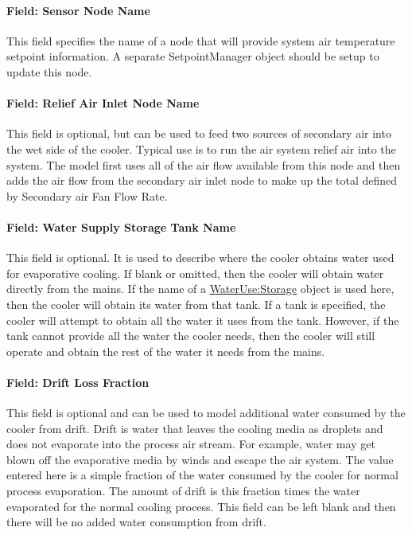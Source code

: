 \paragraph{Field: Sensor Node Name}\label{field-sensor-node-name-1}

This field specifies the name of a node that will provide system air temperature setpoint information. A separate SetpointManager object should be setup to update this node.

\paragraph{Field: Relief Air Inlet Node Name}\label{field-relief-air-inlet-node-name}

This field is optional, but can be used to feed two sources of secondary air into the wet side of the cooler. Typical use is to run the air system relief air into the system. The model first uses all of the air flow available from this node and then adds the air flow from the secondary air inlet node to make up the total defined by Secondary air Fan Flow Rate.

\paragraph{Field: Water Supply Storage Tank Name}\label{field-water-supply-storage-tank-name-4}

This field is optional. It is used to describe where the cooler obtains water used for evaporative cooling. If blank or omitted, then the cooler will obtain water directly from the mains. If the name of a \hyperref[waterusestorage]{WaterUse:Storage} object is used here, then the cooler will obtain its water from that tank. If a tank is specified, the cooler will attempt to obtain all the water it uses from the tank. However, if the tank cannot provide all the water the cooler needs, then the cooler will still operate and obtain the rest of the water it needs from the mains.

\paragraph{Field: Drift Loss Fraction}\label{field-drift-loss-fraction-2}

This field is optional and can be used to model additional water consumed by the cooler from drift. Drift is water that leaves the cooling media as droplets and does not evaporate into the process air stream. For example, water may get blown off the evaporative media by winds and escape the air system. The value entered here is a simple fraction of the water consumed by the cooler for normal process evaporation. The amount of drift is this fraction times the water evaporated for the normal cooling process. This field can be left blank and then there will be no added water consumption from drift.

